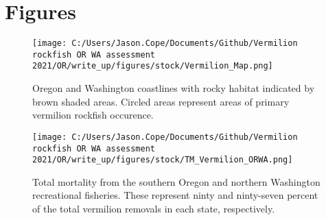 \documentclass[11pt,
  english,
  a4paper,
]{article}
\begin{document}




\newpage







\newpage



\newpage

\clearpage


\hypertarget{figures}{%
\section{Figures}\label{figures}}

\leavevmode\tagmcend\tagstructend


\begin{figure}
\centering
\texttt{[image: C:/Users/Jason.Cope/Documents/Github/Vermilion rockfish OR WA assessment 2021/OR/write\_up/figures/stock/Vermilion\_Map.png]}
\caption{Oregon and Washington coastlines with rocky habitat indicated by brown shaded areas. Circled areas represent areas of primary vermilion rockfish occurence.\label{fig:ORWA-map}}
\end{figure}

\tagmcend\tagstructend


\begin{figure}
\centering
\texttt{[image: C:/Users/Jason.Cope/Documents/Github/Vermilion rockfish OR WA assessment 2021/OR/write\_up/figures/stock/TM\_Vermilion\_ORWA.png]}
\caption{Total mortality from the southern Oregon and northern Washington recreational fisheries. These represent ninty and ninty-seven percent of the total vermilion removals in each state, respectively.\label{fig:tm-plot}}
\end{figure}
\end{document}
